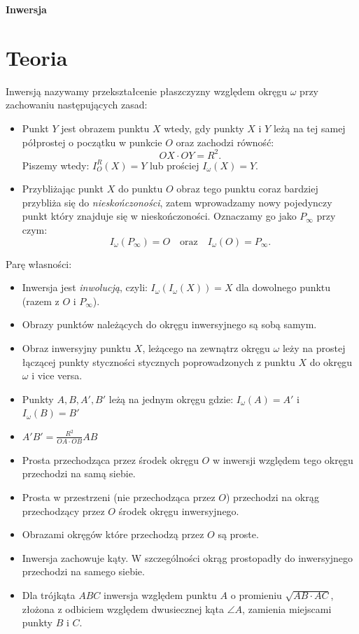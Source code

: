 \documentclass{lecture-kuznia}
\def\title{Inwersja}
\begin{document}
\begin{center}{\Huge\textbf{\title{}}}\end{center}

\section{Teoria}

Inwersją nazywamy przekształcenie płaszczyzny względem okręgu $\omega$ przy zachowaniu następujących zasad:
\begin{itemize}
    \item Punkt $Y$ jest obrazem punktu $X$ wtedy, gdy punkty $X$ i $Y$ leżą na tej samej półprostej o początku w punkcie $O$ oraz zachodzi równość: 
    \[
    OX \cdot OY = R^2.
    \]
    Piszemy wtedy: $I_{O}^R(X) = Y$ lub prościej $I_{\omega}(X) = Y$.
    \item Przybliżając punkt $X$ do punktu $O$ obraz tego punktu coraz bardziej przybliża się do \textit{nieskończoności}, zatem wprowadzamy nowy pojedynczy punkt który znajduje się w nieskończoności. Oznaczamy go jako $P_{\infty}$ przy czym: 
    \[
        I_{\omega}(P_{\infty}) = O \quad \text{oraz} \quad I_{\omega}(O) = P_{\infty}.
    \]
\end{itemize}
	{Parę własności:}
\begin{itemize}
    \item Inwersja jest \textit{inwolucją}, czyli:  $I_{\omega}(I_{\omega}(X))=X$ dla dowolnego punktu (razem z $O$ i $P_{\infty}$).
    \item Obrazy punktów należących  do okręgu inwersyjnego są sobą samym.
    \item Obraz inwersyjny punktu $X$, leżącego na zewnątrz okręgu $\omega$ leży na prostej łączącej punkty styczności stycznych poprowadzonych z punktu $X$ do okręgu $\omega$ i vice versa.
    \item Punkty $A,B,A',B'$ leżą na jednym okręgu gdzie: $I_{\omega}(A) = A'$ i  $I_{\omega}(B) = B'$
    \item $A'B' = \frac{R^2}{OA \cdot OB} AB$
    \item Prosta przechodząca przez środek okręgu $O$ w inwersji względem tego okręgu przechodzi na samą siebie.
    \item Prosta w przestrzeni (nie przechodząca przez $O$) przechodzi na okrąg przechodzący przez $O$ środek okręgu inwersyjnego.
    \item Obrazami okręgów które przechodzą przez $O$ są proste.
    \item Inwersja zachowuje kąty. W szczególności okrąg prostopadły do inwersyjnego przechodzi na samego siebie.
    \item Dla trójkąta $ABC$ inwersja względem punktu $A$ o promieniu $\sqrt{AB \cdot AC}$, złożona z odbiciem względem dwusiecznej kąta $\angle A$, zamienia miejscami punkty $B$ i $C$.
\end{itemize}
\end{document}
